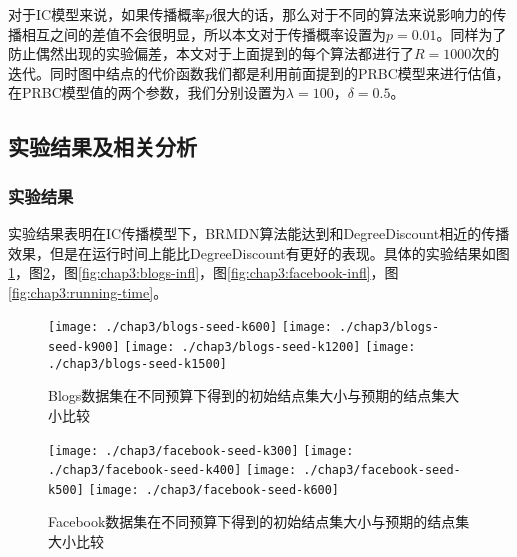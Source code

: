 对于IC模型来说，如果传播概率$p$很大的话，那么对于不同的算法来说影响力的传播相互之间的差值不会很明显，所以本文对于传播概率设置为$p=0.01$。同样为了防止偶然出现的实验偏差，本文对于上面提到的每个算法都进行了$R=1000$次的迭代。同时图中结点的代价函数我们都是利用前面提到的PRBC模型来进行估值，在PRBC模型值的两个参数，我们分别设置为$\lambda=100$，$\delta=0.5$。


\subsection{实验结果及相关分析}
\subsubsection{实验结果}
实验结果表明在IC传播模型下，BRMDN算法能达到和DegreeDiscount相近的传播效果，但是在运行时间上能比DegreeDiscount有更好的表现。具体的实验结果如图\ref{fig:chap3:blogs-seed}，图\ref{fig:chap3:facebook-seed}，图\ref{fig:chap3:blogs-infl}，图\ref{fig:chap3:facebook-infl}，图\ref{fig:chap3:running-time}。


\begin{figure}[H]
	\centering%
	{\texttt{[image: ./chap3/blogs-seed-k600]}}
	\hspace{3em}%
	{\texttt{[image: ./chap3/blogs-seed-k900]}}
	\hspace{3em}%
	{\texttt{[image: ./chap3/blogs-seed-k1200]}}
	\hspace{3em}%
	{\texttt{[image: ./chap3/blogs-seed-k1500]}}
	\caption{Blogs数据集在不同预算下得到的初始结点集大小与预期的结点集大小比较}
	\label{fig:chap3:blogs-seed}
\end{figure}


\begin{figure}[H]
	\centering%
	{\texttt{[image: ./chap3/facebook-seed-k300]}}
	\hspace{3em}%
	{\texttt{[image: ./chap3/facebook-seed-k400]}}
	\hspace{3em}%
	{\texttt{[image: ./chap3/facebook-seed-k500]}}
	\hspace{3em}%
	{\texttt{[image: ./chap3/facebook-seed-k600]}}
	\caption{Facebook数据集在不同预算下得到的初始结点集大小与预期的结点集大小比较}
	\label{fig:chap3:facebook-seed}
\end{figure}


